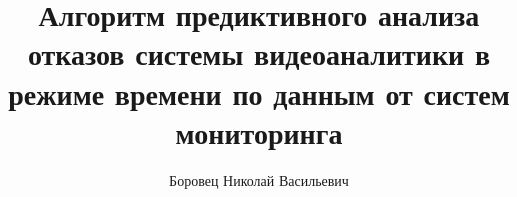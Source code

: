 \title{Алгоритм предиктивного анализа отказов системы видеоаналитики в режиме времени по данным от систем мониторинга}
\author{Боровец Николай Васильевич}

\makeatletter
\renewcommand{\maketitle}{
	\begin{titlepage}
		\renewcommand{\baselinestretch}{1}
		\begin{small}
			\begin{center}
				Федеральное государственное автономное образовательное учреждение\\
				высшего образования «Московский физико-технический институт\\
				(национальный исследовательский университет)»\\[.5\baselineskip]
				Физтех-школа аэрокосмических технологий\\[.5\baselineskip]
				Кафедра Аэрофизики летательных аппаратов
			\end{center}
			
			~\
			
			\textbf{Направление подготовки:} 09.03.01 Информатика и вычислительная техника \\(бакалавриат)
			
			\textbf{Направленность (профиль) подготовки:} Компьютерное моделирование
			
			\textbf{Форма обучения:} очная
		\end{small}
		
		\vfill
		
		\begin{center}
			ВЫПУСКНАЯ КВАЛИФИКАЦИОННАЯ РАБОТА\\[.5\baselineskip]
			\textbf{«\@title»}\\[.5\baselineskip]
			(бакалаврская работа)
		\end{center}
		
		\vfill
		
		\begin{flushright}
			\begin{minipage}{.5\linewidth}
				\textbf{Студент:}\\
				\@author\\
				\(\underset{\emph{(подпись студента)}}{\uline{\hspace*{\linewidth-\baselineskip}}}\)
				
				~\
				

\end{minipage}
\end{flushright}
\end{titlepage}}
